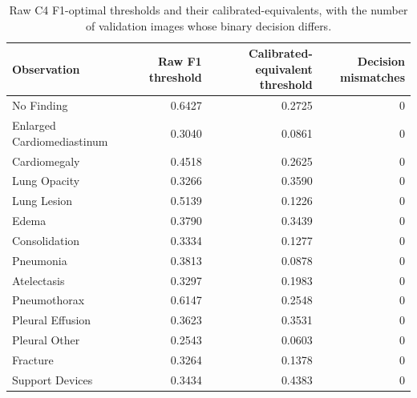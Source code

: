 \begin{table}[t]
\centering
\small
\begin{tabular}{lrrr}
\hline
Observation & Raw F1 threshold & Calibrated-equivalent threshold & Decision mismatches \\
\hline
No Finding & 0.6427 & 0.2725 & 0 \\
Enlarged Cardiomediastinum & 0.3040 & 0.0861 & 0 \\
Cardiomegaly & 0.4518 & 0.2625 & 0 \\
Lung Opacity & 0.3266 & 0.3590 & 0 \\
Lung Lesion & 0.5139 & 0.1226 & 0 \\
Edema & 0.3790 & 0.3439 & 0 \\
Consolidation & 0.3334 & 0.1277 & 0 \\
Pneumonia & 0.3813 & 0.0878 & 0 \\
Atelectasis & 0.3297 & 0.1983 & 0 \\
Pneumothorax & 0.6147 & 0.2548 & 0 \\
Pleural Effusion & 0.3623 & 0.3531 & 0 \\
Pleural Other & 0.2543 & 0.0603 & 0 \\
Fracture & 0.3264 & 0.1378 & 0 \\
Support Devices & 0.3434 & 0.4383 & 0 \\
\hline
\end{tabular}
\caption{Raw C4 F1-optimal thresholds and their calibrated-equivalents, with the number of validation images whose binary decision differs.}
\label{tab:table4_threshold_mapping}
\end{table}
